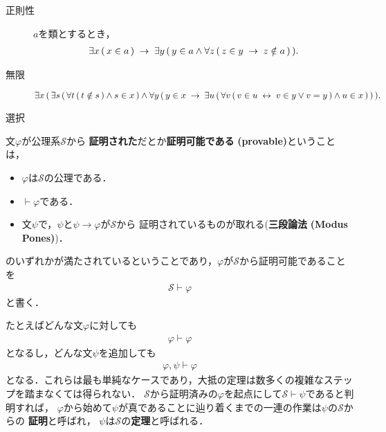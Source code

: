 \begin{description}
		\item[正則性] $a$を類とするとき，
			\begin{align}
				\exists x\, (\, x \in a\, ) \hspace{0.25em}\rightarrow\hspace{0.25em}
				\exists y\, (\, y \in a \wedge \forall z\, (\, z \in y \hspace{0.25em}\rightarrow\hspace{0.25em}
				z \notin a\, )\, ).
			\end{align}
			
		\item[無限] $\exists x\, (\, 
				\exists s\, (\, \forall t\, (\, t \notin s\, ) \wedge s \in x\, ) 
				\wedge \forall y\, (\, 
				y \in x \hspace{0.25em}\rightarrow\hspace{0.25em} \exists u\, (\, 
				\forall v\, (\, v \in u \hspace{0.25em}\leftrightarrow\hspace{0.25em} v \in y \vee v = y\, )
				\wedge u \in x\, )\, )\, ).$
			
		\item[選択]
			
	\end{description}
	
	\begin{screen}
		\begin{metadfn}[証明可能]
			文$\varphi$が公理系$\mathscr{S}$から
			{\bf 証明された}だとか{\bf 証明可能である}
			{\bf (provable)}ということは，
			\begin{itemize}
				\item $\varphi$は$\mathscr{S}$の公理である．
				\item $\vdash \varphi$である．
				\item 文$\psi$で，$\psi$と$\psi \rightarrow \varphi$が$\mathscr{S}$から
				証明されているものが取れる({\bf 三段論法}
				{\bf (Modus Pones)})．
			\end{itemize}
			のいずれかが満たされているということであり，$\varphi$が$\mathscr{S}$から証明可能であることを
			\begin{align}
				\mathscr{S} \vdash \varphi
			\end{align}
			と書く．
		\end{metadfn}
	\end{screen}
	
	たとえばどんな文$\varphi$に対しても
	\begin{align}
		\varphi \vdash \varphi
	\end{align}
	となるし，どんな文$\psi$を追加しても
	\begin{align}
		\varphi,\psi \vdash \varphi
	\end{align}
	となる．これらは最も単純なケースであり，大抵の定理は数多くの複雑なステップを踏まなくては得られない．
	$\mathscr{S}$から証明済みの$\varphi$を起点にして$\mathscr{S} \vdash \psi$であると判明すれば，
	$\varphi$から始めて$\psi$が真であることに辿り着くまでの一連の作業は$\psi$の$\mathscr{S}$からの
	{\bf 証明}と呼ばれ，
	$\psi$は$\mathscr{S}$の{\bf 定理}と呼ばれる．
	
